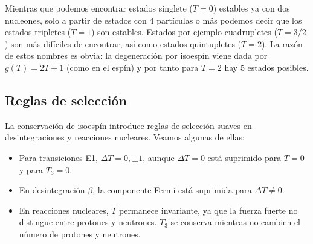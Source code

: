 Mientras que podemos encontrar estados singlete ($T=0$) estables ya con dos nucleones, solo a partir de estados con 4 partículas o más podemos decir que los estados tripletes ($T=1$) son estables.  Estados por ejemplo cuadrupletes ($T=3/2$) son más difíciles de encontrar, así como estados quintupletes ($T=2$). La razón de estos nombres es obvia: la degeneración por isoespín viene dada por $g(T)=2T+1$ (como en el espín) y por tanto para $T=2$ hay 5 estados posibles. 

\subsection{Reglas de selección}

La conservación de isoespín introduce reglas de selección suaves en desintegraciones y reacciones nucleares. Veamos algunas de ellas:

\begin{itemize}
    \item Para transiciones E1, $\Delta T = 0,\pm 1$, aunque $\Delta T=0$ está suprimido para $T=0$ y para $T_3=0$.
    \item En desintegración $\beta$, la componente Fermi está suprimida para $\Delta T\neq 0$.
    \item En reacciones nucleares, $T$ permanece invariante, ya que la fuerza fuerte no distingue entre protones y neutrones. $T_3$ se conserva mientras no cambien el número de protones y neutrones.
\end{itemize}